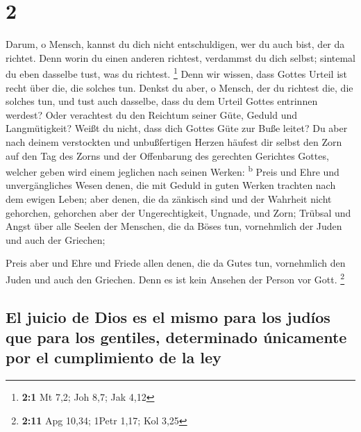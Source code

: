 \hypertarget{section-1}{%
\section{2}\label{section-1}}

 Darum, o Mensch, kannst du dich nicht entschuldigen, wer
du auch bist, der da richtet. Denn worin du einen anderen richtest,
verdammst du dich selbst; sintemal du eben dasselbe tust, was du
richtest. \footnote{\textbf{2:1} Mt 7,2; Joh 8,7; Jak 4,12}
 Denn wir wissen, dass Gottes Urteil ist recht über die,
die solches tun.  Denkst du aber, o Mensch, der du
richtest die, die solches tun, und tust auch dasselbe, dass du dem
Urteil Gottes entrinnen werdest?  Oder verachtest du den
Reichtum seiner Güte, Geduld und Langmütigkeit? Weißt du nicht, dass
dich Gottes Güte zur Buße leitet?  Du aber nach deinem
verstockten und unbußfertigen Herzen häufest dir selbst den Zorn auf den
Tag des Zorns und der Offenbarung des gerechten Gerichtes Gottes,
 welcher geben wird einem jeglichen nach seinen Werken:
\textsuperscript{b}  Preis und Ehre und unvergängliches
Wesen denen, die mit Geduld in guten Werken trachten nach dem ewigen
Leben;  aber denen, die da zänkisch sind und der Wahrheit
nicht gehorchen, gehorchen aber der Ungerechtigkeit, Ungnade, und Zorn;
 Trübsal und Angst über alle Seelen der Menschen, die da
Böses tun, vornehmlich der Juden und auch der Griechen;

 Preis aber und Ehre und Friede allen denen, die da Gutes
tun, vornehmlich den Juden und auch den Griechen.  Denn
es ist kein Ansehen der Person vor Gott. \footnote{\textbf{2:11} Apg
  10,34; 1Petr 1,17; Kol 3,25}

\hypertarget{el-juicio-de-dios-es-el-mismo-para-los-juduxedos-que-para-los-gentiles-determinado-uxfanicamente-por-el-cumplimiento-de-la-ley}{%
\subsection{El juicio de Dios es el mismo para los judíos que para los
gentiles, determinado únicamente por el cumplimiento de la
ley}\label{el-juicio-de-dios-es-el-mismo-para-los-juduxedos-que-para-los-gentiles-determinado-uxfanicamente-por-el-cumplimiento-de-la-ley}}

